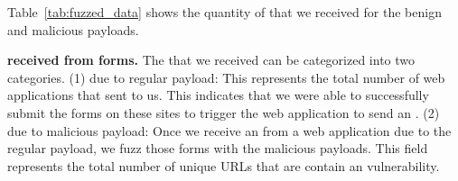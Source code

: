 
Table~\ref{tab:fuzzed_data} shows the quantity of \emails that we received for the benign and malicious payloads. 


\noindent\textbf{\Email received from forms.} The \emails that we
received can be categorized into two categories. (1) \Emails due to
regular payload: This represents the total number of web applications
that sent \emails to us. This indicates that we were able to
successfully submit the forms on these sites to trigger the web
application to send an \email. (2) \Emails due to malicious payload:
Once we receive an \email from a web application due to the regular
payload, we fuzz those forms with the malicious payloads. This field
represents the total number of unique URLs that are contain an \ehi
vulnerability.



